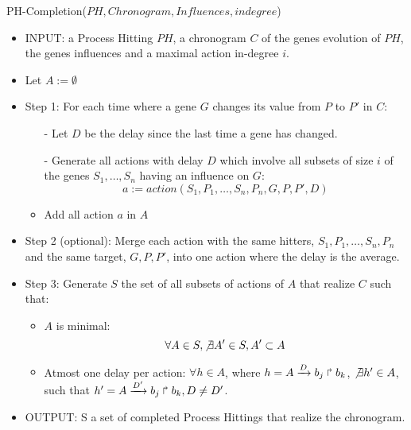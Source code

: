 \begin{algorithm}
	\caption{PH-Completion($PH,Chronogram,Influences,indegree$)}
	\label{alg:PHC_ap}
	\begin{itemize}
		\item INPUT: a Process Hitting $PH$, a chronogram $C$ of the genes evolution of $PH$, the genes influences and a maximal action in-degree $i$.

		\item Let $A := \emptyset$
		\item Step 1: For each time where a gene $G$ changes its value from $P$ to $P'$ in $C$:

		\begin{itemize}
			\item[-] Let $D$ be the delay since the last time a gene has changed.
			\item[-] Generate all actions with delay $D$ which involve all subsets of size $i$ of the genes $S_1, \ldots, S_n$ having an influence on $G$:
			$$a := action(S_1,P_1,\ldots, S_n,P_n, G, P, P', D)$$
			\item Add all action $a$ in $A$
		\end{itemize}
		
		\item Step 2 (optional): Merge each action with the same hitters, $S_1,P_1,\ldots, S_n,P_n$ and the same target, $G, P, P'$,
		into one action where the delay is the average.
		
		\item Step 3: Generate $S$ the set of all subsets of actions of $A$ that realize $C$ such that:
		\begin{itemize}
			\item $A$ is minimal: $$\forall A \in S, \not \exists A' \in S, A' \subset A$$
			\item Atmost one delay per action: $\forall h \in A$, where $h = A\xrightarrow{D} b_j \Rsh b_k$, $\not \exists h' \in A$, such that $h' = A\xrightarrow{D'} b_j \Rsh b_k, D \not = D'$.
		\end{itemize}
			
		\item OUTPUT: S a set of completed Process Hittings that realize the chronogram.
	\end{itemize}
\end{algorithm}

